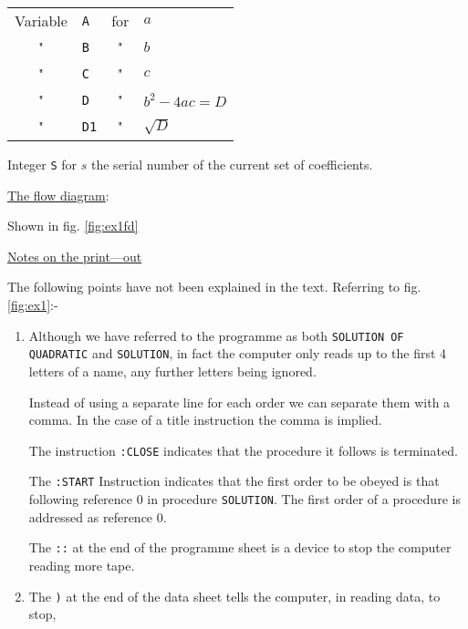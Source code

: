 \documentclass[10pt, a4paper, oneside]{article}
\newcommand{\myuline}[1]{\uline{#1}}
\newcommand{\mytt}[1]{\texttt{\footnotesize #1}}
\begin{document}
\begin{multicols}{2}
\begin{tabular}{clcl}
Variable & \mytt{A}  & for & $a$ \\
   "     & \mytt{B}  &  "  & $b$ \\
   "     & \mytt{C}  &  "  & $c$ \\
   "     & \mytt{D}  &  "  & $b^{2} -4ac = D$ \\
   "     & \mytt{D1} &  "  & $\sqrt{D}$ \\
\end{tabular}

Integer \mytt{S} for $s$ the serial number of the current set of
coefficients.

\begin{flushleft}
\myuline{The flow diagram}:
\end{flushleft}

Shown in fig. \ref{fig:ex1fd}

\begin{flushleft}
\myuline{Notes on the print—out}
\end{flushleft}

The following points have not been explained
in the text.  Referring to fig. \ref{fig:ex1}:-

\renewcommand{\labelenumi}{\Alph{enumi}.}
\begin{enumerate}

\item Although we have referred to the programme
as both \mytt{SOLUTION OF QUADRATIC} and \mytt{SOLUTION}, in fact
the computer only reads up to the first 4 letters of a
name, any further letters being ignored.

\hspace{1em}Instead of using a separate line for each
order we can separate them with a comma.  In the case
of a title instruction the comma is implied.

\hspace{1em}The instruction \mytt{:CLOSE} indicates that the
procedure it follows is terminated.

\hspace{1em}The \mytt{:START} Instruction indicates that the
first order to be obeyed is that following reference 0
in procedure \mytt{SOLUTION}.  The first order of a
procedure is addressed as reference 0.

\hspace{1em}The \mytt{::} at the end of the programme sheet is
a device to stop the computer reading more tape.

\item The \mytt{)} at the end of the data sheet tells the
computer, in reading data, to stop,


\end{enumerate}
\end{multicols}
\end{document}
